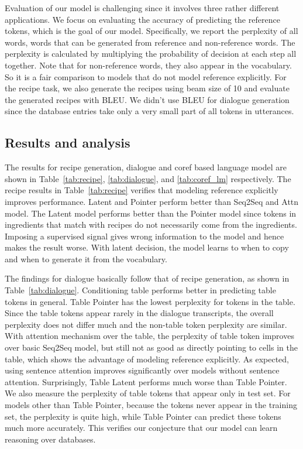 \documentclass[11pt,letterpaper]{article}
\begin{document}
Evaluation of our model is challenging since it involves three rather different
applications. We focus on evaluating the accuracy of predicting the reference
tokens, which is the goal of our model.  Specifically, we report the perplexity
of all words, words that can be generated from reference and non-reference
words. The perplexity is calculated by multiplying the probability of decision
at each step all together. Note that for non-reference words, they also appear
in the vocabulary. So it is a fair comparison to models that do not model
reference explicitly. For the recipe task, we also generate the recipes using
beam size of 10 and evaluate the generated recipes with BLEU. We didn't use
BLEU for dialogue generation since the database entries take only a very small
part of all tokens in utterances.

\subsection{Results and analysis}
The results for recipe generation, dialogue and coref based language model are shown
in Table~\ref{tab:recipe}, \ref{tab:dialogue}, and \ref{tab:coref_lm}
respectively. The recipe results in Table~\ref{tab:recipe} verifies that
modeling reference explicitly improves performance. Latent and Pointer perform
better than Seq2Seq and Attn model. The Latent model performs better than the Pointer model
since tokens in ingredients that match with recipes do not necessarily
come from the ingredients. Imposing a supervised signal gives wrong information
to the model and hence makes the result worse. With latent decision, the model
learns to when to copy and when to generate it from the vocabulary.

The findings for dialogue basically follow that of recipe generation, as shown in Table~\ref{tab:dialogue}. 
Conditioning table performs better in predicting table 
tokens in general. Table Pointer has the lowest perplexity for tokens in the table. Since the table
tokens appear rarely in the dialogue transcripts, the overall perplexity does
not differ much and the non-table token perplexity are similar. With attention
mechanism over the table, the perplexity of table token improves over basic
Seq2Seq model, but still not as good as directly pointing to cells in the table,
which shows the advantage of modeling reference explicitly. As expected, using
sentence attention improves significantly over models without sentence
attention. Surprisingly, Table Latent performs much worse than Table
Pointer. We also measure the perplexity of table tokens that appear only in
test set. For models other than Table Pointer, because the tokens never appear
in the training set, the perplexity is quite high, while Table Pointer can predict
these tokens much more accurately. This verifies our conjecture that our model
can learn reasoning over databases.
\end{document}
